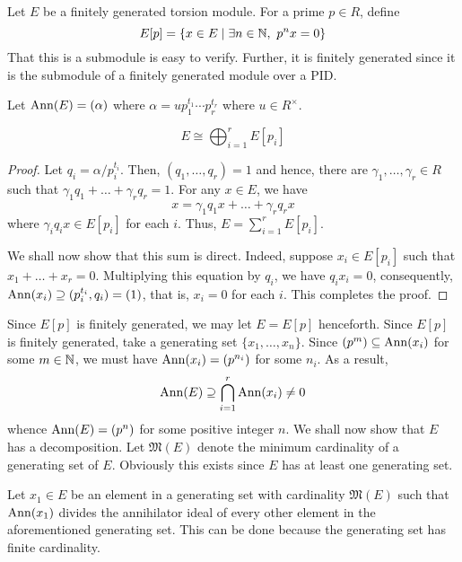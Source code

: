 Let $E$ be a finitely generated torsion module. For a prime $p\in R$, define
\begin{equation*}
    E[p] = \{x\in E\mid\exists n\in\mathbb{N},~p^nx = 0\}
\end{equation*}
That this is a submodule is easy to verify. Further, it is finitely generated since it is the submodule of a finitely generated module over a PID. 

Let $\operatorname{Ann}(E) = (\alpha)$ where $\alpha = up_1^{t_1}\cdots p_r^{t_r}$ where $u\in R^\times$.

\begin{lemma}
    \begin{equation*}
        E\cong\bigoplus_{i = 1}^r E[p_i]
    \end{equation*}
\end{lemma}
\begin{proof}
    Let $q_i = \alpha/p_i^{t_i}$. Then, $(q_1,\dots,q_r) = 1$ and hence, there are $\gamma_1,\dots,\gamma_r\in R$ such that $\gamma_1q_1 + \dots + \gamma_rq_r = 1$. For any $x\in E$, we have 
    \begin{equation*}
        x = \gamma_1q_1 x + \dots + \gamma_rq_rx
    \end{equation*}
    where $\gamma_iq_ix\in E[p_i]$ for each $i$. Thus, $E = \sum_{i = 1}^rE[p_i]$.

    We shall now show that this sum is direct. Indeed, suppose $x_i\in E[p_i]$ such that $x_1 + \dots + x_r = 0$. Multiplying this equation by $q_i$, we have $q_ix_i = 0$, consequently, $\operatorname{Ann}(x_i)\supseteq(p_i^{t_i}, q_i) = (1)$, that is, $x_i = 0$ for each $i$. This completes the proof.
\end{proof}

Since $E[p]$ is finitely generated, we may let $E = E[p]$ henceforth. Since $E[p]$ is finitely generated, take a generating set $\{x_1,\ldots,x_n\}$. Since $(p^m)\subseteq\operatorname{Ann}(x_i)$ for some $m\in\mathbb{N}$, we must have $\operatorname{Ann}(x_i) = (p^{n_i})$ for some $n_i$. As a result, 
\begin{equation*}
    \operatorname{Ann}(E)\supseteq\bigcap_{i = 1}^r\operatorname{Ann}(x_i)\ne 0
\end{equation*}
whence $\operatorname{Ann}(E) = (p^{n})$ for some positive integer $n$. We shall now show that $E$ has a decomposition. Let $\mathfrak M(E)$ denote the minimum cardinality of a generating set of $E$. Obviously this exists since $E$ has at least one generating set.

Let $x_1\in E$ be an element in a generating set with cardinality $\mathfrak M(E)$ such that $\operatorname{Ann}(x_1)$ divides the annihilator ideal of every other element in the aforementioned generating set. This can be done because the generating set has finite cardinality. 

